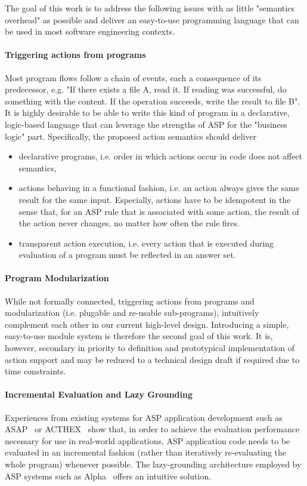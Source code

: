 
The goal of this work is to address the following issues with as little "semantics overhead" as possible and deliver an easy-to-use programming language that can be used in most software engineering contexts.

\paragraph{Triggering actions from programs} Most program flows follow a chain of events, each a consequence of its predecessor, e.g. "If there exists a file A, read it. If reading was successful, do something with the content. If the operation succeeds, write the result to file B". It is highly desirable to be able to write this kind of program in a declarative, logic-based language that can leverage the strengths of ASP for the "business logic" part. Specifically, the proposed action semantics should deliver
\begin{itemize}
    \item declarative programs, i.e. order in which actions occur in code does not affect semantics,
    \item actions behaving in a functional fashion, i.e. an action always gives the same result for the same input. Especially, actions have to be idempotent in the sense that, for an ASP rule that is associated with some action, the result of the action never changes, no matter how often the rule fires.
    \item transparent action execution, i.e. every action that is executed during evaluation of a program must be reflected in an answer set.
\end{itemize}

\paragraph{Program Modularization} While not formally connected, triggering actions from programs and modularization (i.e. plugable and re-usable sub-programs), intuitively complement each other in our current high-level design. Introducing a simple, easy-to-use module system is therefore the second goal of this work. It is, however, secondary in priority to definition and prototypical implementation of action support and may be reduced to a technical design draft if required due to time constraints.

\paragraph{Incremental Evaluation and Lazy Grounding} Experiences from existing systems for ASP application development such as ASAP~\cite{aspetris} or ACTHEX~\cite{acthex} show that, in order to achieve the evaluation performance necessary for use in real-world applications, ASP application code needs to be evaluated in an incremental fashion (rather than iteratively re-evaluating the whole program) whenever possible. The lazy-grounding architecture employed by ASP systems such as Alpha~\cite{alpha} offers an intuitive solution.